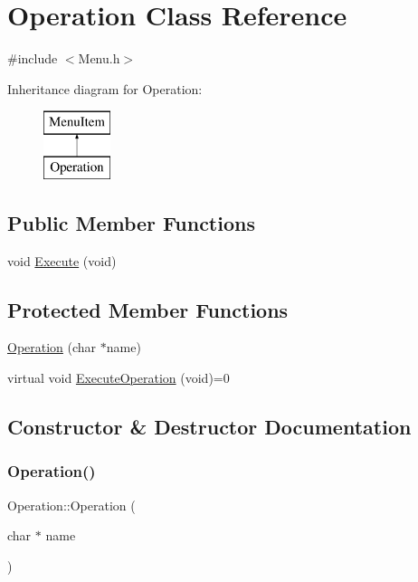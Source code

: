 \hypertarget{class_operation}{}\section{Operation Class Reference}
\label{class_operation}


{\ttfamily \#include $<$Menu.\+h$>$}

Inheritance diagram for Operation\+:\begin{figure}[H]
\begin{center}
\leavevmode
\includegraphics[height=2.000000cm]{class_operation}
\end{center}
\end{figure}
\subsection*{Public Member Functions}
\begin{DoxyCompactItemize}
\item 
void \hyperlink{class_operation_a669c894cc03d476fd8acecbf880dd606}{Execute} (void)
\end{DoxyCompactItemize}
\subsection*{Protected Member Functions}
\begin{DoxyCompactItemize}
\item 
\hyperlink{class_operation_a384d3cf47af8e48cf5199b93106d9d5f}{Operation} (char $\ast$name)
\item 
virtual void \hyperlink{class_operation_a40ffe4a0030abaf7db98f94515ccb17e}{Execute\+Operation} (void)=0
\end{DoxyCompactItemize}


\subsection{Constructor \& Destructor Documentation}
\mbox{\label{class_operation_a384d3cf47af8e48cf5199b93106d9d5f}} 
\subsubsection{\texorpdfstring{Operation()}{Operation()}}
{\footnotesize\ttfamily Operation\+::\+Operation (\begin{DoxyParamCaption}\item[{char $\ast$}]{name }\end{DoxyParamCaption})\hspace{0.3cm}{\ttfamily [protected]}}



